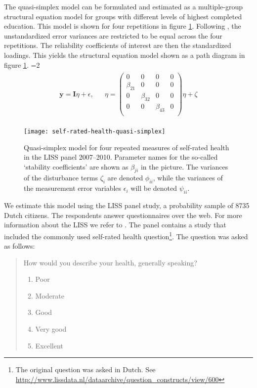 \documentclass[a4paper,11pt]{article}
\newcommand{\0}{\boldsymbol{0}}
\begin{document}
The quasi-simplex model can be formulated and estimated as a multiple-group structural equation model for groups with different  levels of highest completed education. This model is shown for four repetitions in figure 
\ref{fig:model}. Following \cite{wiley35wiley}, the unstandardized error variances are restricted to be equal across the four repetitions. The reliability coefficients of interest are then the standardized loadings. This yields the  structural equation model shown as a path diagram in figure \ref{fig:model}.
=2
\begin{eqnarray*}\begin{split}
\textbf{y} =  \textbf{I} {\eta} + \epsilon,& &
{\eta} = \begin{pmatrix}
	0 & 0 & 0 & 0\\
	\beta_{21} & 0 & 0 & 0\\
	0 & \beta_{32} & 0 & 0\\
	0 & 0 & \beta_{43} & 0\\	
\end{pmatrix} {\eta} + \zeta
\end{split}
\end{eqnarray*}
\fi


\begin{figure}[bt]\begin{center}
\caption{Quasi-simplex model for four repeated measures of self-rated health in the LISS panel 2007--2010. Parameter names for the 
	so-called `stability coefficients' are shown as $\beta_{ji}$ in the picture. The variances of the disturbance terms $\zeta_i$ are denoted
	$\phi_{ii}$, while the variances of the measurement error variables $\epsilon_i$ will be denoted $\psi_{ii}$.}
\label{fig:model}
\texttt{[image: self-rated-health-quasi-simplex]}
\end{center}
\end{figure}

We estimate this model using the LISS panel study, a probability sample 
of 8735 Dutch citizens. The respondents answer questionnaires over the web. For more information about the LISS we refer to \cite{scherpenzeel2011data}.
The  panel contains a study that included the commonly used self-rated health question\footnote{The original question was asked in Dutch. See \url{http://www.lissdata.nl/dataarchive/question_constructs/view/600}}. The question was asked as follows:
\begin{quote}
	How would you describe your health, generally speaking?
	
	\begin{enumerate}  \setlength{\itemsep}{0pt}  \setlength{\parskip}{0pt}
  \setlength{\parsep}{0pt}
		\item Poor
		\item Moderate
		\item Good
		\item Very good
		\item Excellent
	\end{enumerate}
\end{quote}
\end{document}
